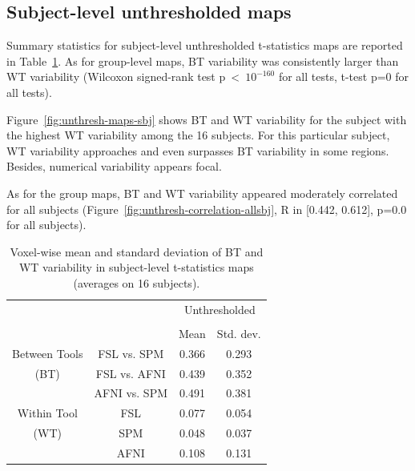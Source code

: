 \documentclass[conference]{IEEEtran}
\begin{document}
  \subsection{Subject-level unthresholded maps}

  Summary statistics for subject-level unthresholded t-statistics maps are
  reported in Table~\ref{table:unthresh-maps-subjects}. As for group-level
  maps, BT variability was consistently larger than WT variability (Wilcoxon
  signed-rank test p~\textless~$10^{-160}$ for all tests, t-test p=0 for all
  tests). 

  Figure~\ref{fig:unthresh-maps-sbj} shows BT and WT variability for
  the subject with the highest WT variability among the 16 subjects. For
  this particular subject, WT variability approaches and even surpasses BT
  variability in some regions. Besides, numerical variability appears focal.

  As for the group maps, BT and WT variability appeared moderately
  correlated for all subjects (Figure~\ref{fig:unthresh-correlation-allsbj}, 
  R in [0.442, 0.612], p=0.0 for all
  subjects).

\setlength{\tabcolsep}{5pt}
\begin{table}[h]
    \centering
    \begin{tabular}{cccc}
        \toprule
        \multirow{2}{*}{}& {} & \multicolumn{2}{c}{Unthresholded} \\
        \cmidrule{3-4} \\
        {} & {} & Mean & Std. dev. \\
        \midrule
        \rowcolor{lightgray}
        {Between Tools} & FSL vs. SPM        &  0.366       & 0.293     \\
        \rowcolor{lightgray}
        {(BT)} & FSL vs. AFNI                &  0.439       & 0.352     \\
        \rowcolor{lightgray}
        {} & AFNI vs. SPM                    &  0.491       & 0.381     \\
        {Within Tool} & FSL                  &  0.077       & 0.054     \\
        {(WT)}   & SPM                       &  0.048       & 0.037     \\
        {}   & AFNI                          &  0.108       & 0.131     \\
        \bottomrule
    \end{tabular} 
    \caption{Voxel-wise mean and standard deviation of BT and WT variability
    in subject-level t-statistics maps (averages on 16 subjects).}
    \label{table:unthresh-maps-subjects}
\end{table}
\end{document}
